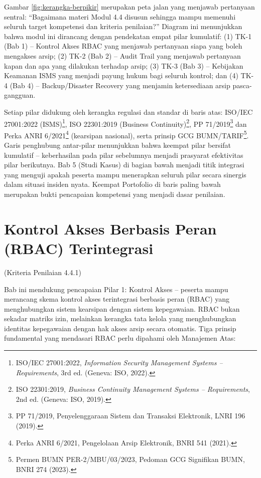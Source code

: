 \documentclass[12pt,a4paper]{report}
\begin{document}
\small Gambar \ref{fig:kerangka-berpikir} merupakan peta jalan yang menjawab pertanyaan sentral: ``Bagaimana materi Modul 4.4 disusun sehingga mampu memenuhi seluruh target kompetensi dan kriteria penilaian?'' Diagram ini menunjukkan bahwa modul ini dirancang dengan pendekatan empat pilar kumulatif: (1) TK-1 (Bab 1) -- Kontrol Akses RBAC yang menjawab pertanyaan siapa yang boleh mengakses arsip; (2) TK-2 (Bab 2) -- Audit Trail yang menjawab pertanyaan kapan dan apa yang dilakukan terhadap arsip; (3) TK-3 (Bab 3) -- Kebijakan Keamanan ISMS yang menjadi payung hukum bagi seluruh kontrol; dan (4) TK-4 (Bab 4) -- Backup/Disaster Recovery yang menjamin ketersediaan arsip pasca-gangguan.

Setiap pilar didukung oleh kerangka regulasi dan standar di baris atas: ISO/IEC 27001:2022 (ISMS)\footnote{ISO/IEC 27001:2022, \textit{Information Security Management Systems -- Requirements}, 3rd ed. (Geneva: ISO, 2022).}, ISO 22301:2019 (Business Continuity)\footnote{ISO 22301:2019, \textit{Business Continuity Management Systems -- Requirements}, 2nd ed. (Geneva: ISO, 2019).}, PP 71/2019\footnote{PP 71/2019, Penyelenggaraan Sistem dan Transaksi Elektronik, LNRI 196 (2019).} dan Perka ANRI 6/2021\footnote{Perka ANRI 6/2021, Pengelolaan Arsip Elektronik, BNRI 541 (2021).} (kearsipan nasional), serta prinsip GCG BUMN/TARIF\footnote{Permen BUMN PER-2/MBU/03/2023, Pedoman GCG Signifikan BUMN, BNRI 274 (2023).}. Garis penghubung antar-pilar menunjukkan bahwa keempat pilar bersifat kumulatif -- keberhasilan pada pilar sebelumnya menjadi prasyarat efektivitas pilar berikutnya. Bab 5 (Studi Kasus) di bagian bawah menjadi titik integrasi yang menguji apakah peserta mampu menerapkan seluruh pilar secara sinergis dalam situasi insiden nyata. Keempat Portofolio di baris paling bawah merupakan bukti pencapaian kompetensi yang menjadi dasar penilaian.

\renewcommand{\thesection}{\thechapter.\arabic{section}}
\chapter{Kontrol Akses Berbasis Peran (RBAC) Terintegrasi}
(Kriteria Penilaian 4.4.1)

Bab ini mendukung pencapaian Pilar 1: Kontrol Akses -- peserta mampu merancang skema kontrol akses terintegrasi berbasis peran (RBAC) yang menghubungkan sistem kearsipan dengan sistem kepegawaian. RBAC bukan sekadar matriks izin, melainkan kerangka tata kelola yang menghubungkan identitas kepegawaian dengan hak akses arsip secara otomatis. Tiga prinsip fundamental yang mendasari RBAC perlu dipahami oleh Manajemen Atas:
\end{document}
